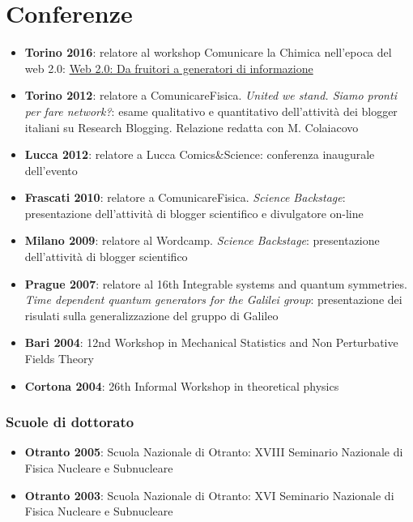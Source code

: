 \documentclass[a4paper,latin1,italian]{article}
\begin{document}
\section{Conferenze}
\begin{itemize}
	\item {\bf Torino 2016}: relatore al workshop Comunicare la Chimica nell'epoca del web 2.0: \href{http://dropseaofulaula.blogspot.it/2016/09/web-20-da-fruitori-generatori-di.html}{Web 2.0: Da fruitori a generatori di informazione}
	\item {\bf Torino 2012}: relatore a ComunicareFisica. {\em United we stand. Siamo pronti per fare network?}: esame qualitativo e quantitativo dell'attivit\`a dei blogger italiani su Research Blogging. Relazione redatta con M. Colaiacovo
	\item {\bf Lucca 2012}: relatore a Lucca Comics\&Science: conferenza inaugurale dell'evento
	\item {\bf Frascati 2010}: relatore a ComunicareFisica. {\em Science Backstage}: presentazione dell'attivit\`a di blogger scientifico e divulgatore on-line
	\item {\bf Milano 2009}: relatore al Wordcamp. {\em Science Backstage}: presentazione dell'attivit\`a di blogger scientifico
	\item {\bf Prague 2007}: relatore al 16th Integrable systems and quantum symmetries. {\em Time dependent quantum generators for the Galilei group}: presentazione dei risulati sulla generalizzazione del gruppo di Galileo
	\item {\bf Bari 2004}: 12nd Workshop in Mechanical Statistics and Non Perturbative Fields Theory
	\item {\bf Cortona 2004}: 26th Informal Workshop in theoretical physics
\end{itemize}
\subsubsection*{Scuole di dottorato}
\begin{itemize}
	\item {\bf Otranto 2005}: Scuola Nazionale di Otranto: XVIII Seminario Nazionale di Fisica Nucleare e Subnucleare
	\item {\bf Otranto 2003}: Scuola Nazionale di Otranto: XVI Seminario Nazionale di Fisica Nucleare e Subnucleare
\end{itemize}
%
\newpage
%
\end{document}
